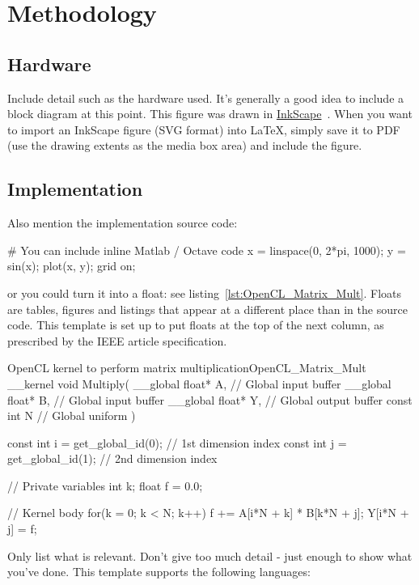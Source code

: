 \section{Methodology}

\subsection{Hardware}
Include detail such as the hardware used.  It's generally a good idea to include a block diagram at this point.  This figure was drawn in \href{http://www.inkscape.org/}{InkScape}~\cite{InkScape}.  When you want to import an InkScape figure (SVG format) into \LaTeX{}, simply save it to PDF (use the drawing extents as the media box area) and include the figure.

\subsection{Implementation}
Also mention the implementation source code:

\begin{Matlab}
# You can include inline Matlab / Octave code
x = linspace(0, 2*pi, 1000);
y = sin(x);
plot(x, y); grid on;
\end{Matlab}

or you could turn it into a float: see listing~\ref{lst:OpenCL_Matrix_Mult}.  Floats are tables, figures and listings that appear at a different place than in the source code.  This template is set up to put floats at the top of the next column, as prescribed by the IEEE article specification.

\begin{OpenCL_float}{OpenCL kernel to perform matrix multiplication}{OpenCL_Matrix_Mult}
__kernel void Multiply(
 __global float* A, // Global input buffer
 __global float* B, // Global input buffer
 __global float* Y, // Global output buffer
   const  int    N  // Global uniform
){
 const int i = get_global_id(0); // 1st dimension index
 const int j = get_global_id(1); // 2nd dimension index

 // Private variables
 int   k;
 float f = 0.0;

 // Kernel body
 for(k = 0; k < N; k++) f += A[i*N + k] * B[k*N + j];
 Y[i*N + j] = f;
}
\end{OpenCL_float}

Only list what is relevant.  Don't give too much detail - just enough to show what you've done.  This template supports the following languages:

